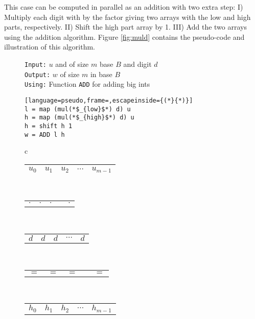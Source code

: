 This case can be computed in parallel as an addition with two extra step: I)
Multiply each digit with by the factor giving two arrays with the low and high
parts, respectively. II) Shift the high part array by 1. III) Add the two arrays
using the addition algorithm. Figure \ref{fig:muld} contains the pseudo-code and
illustration of this algorithm.

\begin{figure}
  \centering
  \begin{minipage}{0.45\textwidth}
    \small
    \texttt{Input:} $u$ and of size $m$ base $B$ and digit $d$\\
    \texttt{Output:} $w$ of size $m$ in base $B$\\
    \texttt{Using:} Function \texttt{ADD} for adding big ints
\begin{lstlisting}[language=pseudo,frame=,escapeinside={(*}{*)}]
l = map (mul(*$_{low}$*) d) u
h = map (mul(*$_{high}$*) d) u
h = shift h 1
w = ADD l h
\end{lstlisting}
  \end{minipage}
  \begin{minipage}{0.45\textwidth}
    \centering
    \footnotesize
    \begin{tabular}{c}
      \begin{tabular}{|C{0.7cm}|C{0.7cm}|C{0.7cm}|C{0.7cm}|C{0.7cm}|}
        \hline
        $u_0$ & $u_1$ & $u_2$ & $\cdots$ & $u_{m-1}$\\ 
        \hline
      \end{tabular}\\[-0.3ex]
      \begin{tabular}{C{0.7cm}C{0.7cm}C{0.7cm}C{0.7cm}C{0.7cm}}
        $\cdot$ & $\cdot$ & $\cdot$ & & $\cdot$\\ 
      \end{tabular}\\[-0.7ex]
      \begin{tabular}{C{0.7cm}C{0.7cm}C{0.7cm}C{0.7cm}C{0.7cm}}
        $d$ & $d$ &  $d$ & $\cdots$ &$d$ \\
      \end{tabular}\\[-0.5ex]
      \begin{tabular}{C{0.7cm}C{0.7cm}C{0.8cm}C{0.7cm}C{0.7cm}}
        $=$ & $=$ & $=$ &  & $=$  
      \end{tabular}\\
      \begin{tabular}{|C{0.7cm}|C{0.7cm}|C{0.7cm}|C{0.7cm}|C{0.7cm}|}
        \hline
        $h_{0}$ & $h_1$ & $h_2$ & $\cdots$ & $h_{m-1}$\\

\end{tabular}
\end{tabular}
\end{minipage}
\end{figure}
